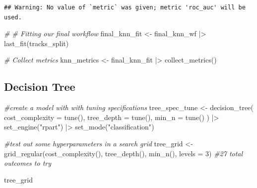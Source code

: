 \documentclass[
]{article}
\newenvironment{Shaded}{\begin{snugshade}}{\end{snugshade}}
\newcommand{\AttributeTok}[1]{\textcolor[rgb]{0.77,0.63,0.00}{#1}}
\newcommand{\CommentTok}[1]{\textcolor[rgb]{0.56,0.35,0.01}{\textit{#1}}}
\newcommand{\DecValTok}[1]{\textcolor[rgb]{0.00,0.00,0.81}{#1}}
\newcommand{\FunctionTok}[1]{\textcolor[rgb]{0.00,0.00,0.00}{#1}}
\newcommand{\NormalTok}[1]{#1}
\newcommand{\OtherTok}[1]{\textcolor[rgb]{0.56,0.35,0.01}{#1}}
\newcommand{\SpecialCharTok}[1]{\textcolor[rgb]{0.00,0.00,0.00}{#1}}
\newcommand{\StringTok}[1]{\textcolor[rgb]{0.31,0.60,0.02}{#1}}
\begin{document}
\begin{verbatim}
## Warning: No value of `metric` was given; metric 'roc_auc' will be used.
\end{verbatim}

\begin{Shaded}
\begin{Highlighting}[]
\CommentTok{\# \# Fitting our final workflow}
\NormalTok{final\_knn\_fit }\OtherTok{\textless{}{-}}\NormalTok{ final\_knn\_wf }\SpecialCharTok{|\textgreater{}} 
  \FunctionTok{last\_fit}\NormalTok{(tracks\_split) }

\CommentTok{\# Collect metrics}
\NormalTok{knn\_metrics }\OtherTok{\textless{}{-}}\NormalTok{ final\_knn\_fit }\SpecialCharTok{|\textgreater{}} \FunctionTok{collect\_metrics}\NormalTok{()}
\end{Highlighting}
\end{Shaded}

\hypertarget{decision-tree}{%
\subsection{Decision Tree}\label{decision-tree}}

\begin{Shaded}
\begin{Highlighting}[]
\CommentTok{\#create a model with with tuning specifications}
\NormalTok{tree\_spec\_tune }\OtherTok{\textless{}{-}} \FunctionTok{decision\_tree}\NormalTok{(}
  \AttributeTok{cost\_complexity =} \FunctionTok{tune}\NormalTok{(),}
  \AttributeTok{tree\_depth =} \FunctionTok{tune}\NormalTok{(),}
  \AttributeTok{min\_n =} \FunctionTok{tune}\NormalTok{()}
\NormalTok{) }\SpecialCharTok{|\textgreater{}} 
  \FunctionTok{set\_engine}\NormalTok{(}\StringTok{"rpart"}\NormalTok{) }\SpecialCharTok{|\textgreater{}} 
  \FunctionTok{set\_mode}\NormalTok{(}\StringTok{"classification"}\NormalTok{)}

\CommentTok{\#test out some hyperparameters in a search grid}
\NormalTok{tree\_grid }\OtherTok{\textless{}{-}} \FunctionTok{grid\_regular}\NormalTok{(}\FunctionTok{cost\_complexity}\NormalTok{(), }\FunctionTok{tree\_depth}\NormalTok{(),}
                          \FunctionTok{min\_n}\NormalTok{(),}
                          \AttributeTok{levels =} \DecValTok{3}\NormalTok{) }\CommentTok{\#27 total outcomes to try}

\NormalTok{tree\_grid}
\end{Highlighting}
\end{Shaded}
\end{document}
